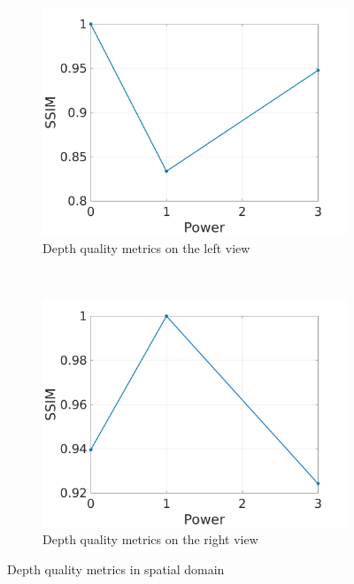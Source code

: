 \begin{figure}[h!]
    \centering
    \begin{subfigure}[t]{0.5\textwidth}
        \centering
\includegraphics[width=1\textwidth]{./img/qm_gauss/gqm_ldisp.png}
          \caption{\small{Depth quality metrics on the left view}}
\label{fig:gqmcr}

    \end{subfigure}%
    ~ 
    \begin{subfigure}[t]{0.5\textwidth}
        \centering
\includegraphics[width=1\textwidth]{./img/qm_gauss/gqm_rdisp.png}
           \caption{\small{Depth quality metrics on the right view}}
\label{fig:gqmdr}
    \end{subfigure}
    \caption{Depth quality metrics in spatial domain }
        \label{fig:gqmd}
\end{figure}

